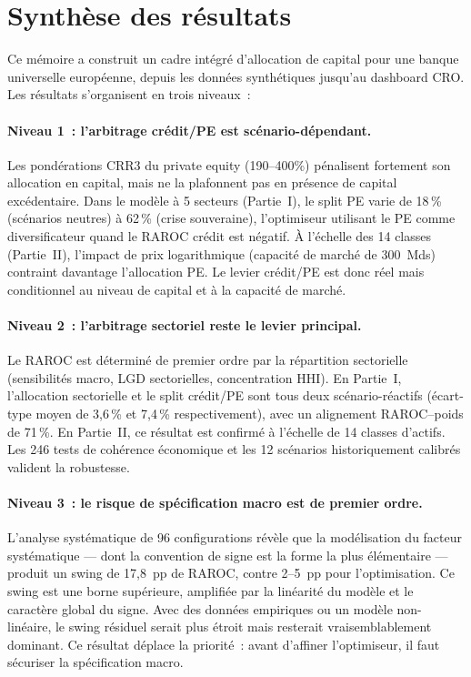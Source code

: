 \documentclass[12pt, a4paper, twoside, openright]{report}
\theoremstyle{definition}
\begin{document}
\section*{Synthèse des résultats}

Ce mémoire a construit un cadre intégré d'allocation de capital pour une banque universelle européenne, depuis les données synthétiques jusqu'au dashboard CRO. Les résultats s'organisent en trois niveaux~:

\paragraph{Niveau 1~: l'arbitrage crédit/PE est scénario-dépendant.} Les pondérations CRR3 du private equity (190--400\%) pénalisent fortement son allocation en capital, mais ne la plafonnent pas en présence de capital excédentaire. Dans le modèle à 5 secteurs (Partie~I), le split PE varie de 18\,\% (scénarios neutres) à 62\,\% (crise souveraine), l'optimiseur utilisant le PE comme diversificateur quand le RAROC crédit est négatif. À l'échelle des 14 classes (Partie~II), l'impact de prix logarithmique (capacité de marché de 300~Mds\texteuro{}) contraint davantage l'allocation PE. Le levier crédit/PE est donc réel mais conditionnel au niveau de capital et à la capacité de marché.

\paragraph{Niveau 2~: l'arbitrage sectoriel reste le levier principal.} Le RAROC est déterminé de premier ordre par la répartition sectorielle (sensibilités macro, LGD sectorielles, concentration HHI). En Partie~I, l'allocation sectorielle et le split crédit/PE sont tous deux scénario-réactifs (écart-type moyen de 3{,}6\,\% et 7{,}4\,\% respectivement), avec un alignement RAROC--poids de 71\,\%. En Partie~II, ce résultat est confirmé à l'échelle de 14 classes d'actifs. Les 246 tests de cohérence économique et les 12 scénarios historiquement calibrés valident la robustesse.

\paragraph{Niveau 3~: le risque de spécification macro est de premier ordre.} L'analyse systématique de 96 configurations révèle que la modélisation du facteur systématique --- dont la convention de signe est la forme la plus élémentaire --- produit un swing de 17,8~pp de RAROC, contre 2--5~pp pour l'optimisation. Ce swing est une borne supérieure, amplifiée par la linéarité du modèle et le caractère global du signe. Avec des données empiriques ou un modèle non-linéaire, le swing résiduel serait plus étroit mais resterait vraisemblablement dominant. Ce résultat déplace la priorité~: avant d'affiner l'optimiseur, il faut sécuriser la spécification macro.
\end{document}
